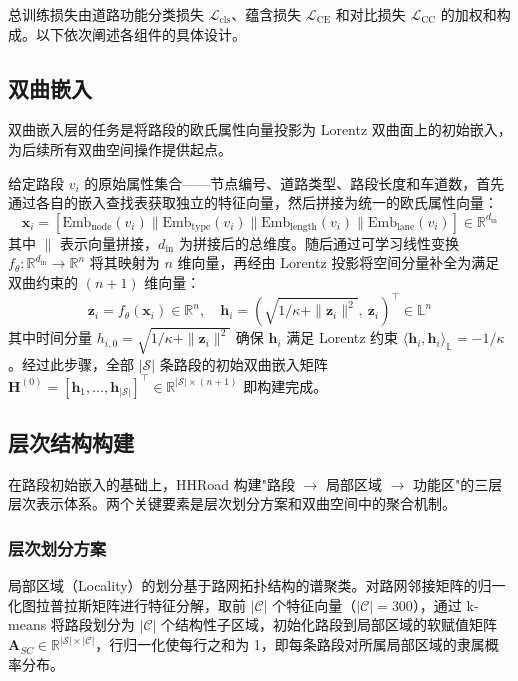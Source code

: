 总训练损失由道路功能分类损失 $\mathcal{L}_{\text{cls}}$、蕴含损失 $\mathcal{L}_{\text{CE}}$ 和对比损失 $\mathcal{L}_{\text{CC}}$ 的加权和构成。以下依次阐述各组件的具体设计。

\subsection{双曲嵌入}

双曲嵌入层的任务是将路段的欧氏属性向量投影为 Lorentz 双曲面上的初始嵌入，为后续所有双曲空间操作提供起点。

给定路段 $v_i$ 的原始属性集合——节点编号、道路类型、路段长度和车道数，首先通过各自的嵌入查找表获取独立的特征向量，然后拼接为统一的欧氏属性向量：
\begin{equation}
    \mathbf{x}_i = [\mathrm{Emb}_{\text{node}}(v_i) \| \mathrm{Emb}_{\text{type}}(v_i) \| \mathrm{Emb}_{\text{length}}(v_i) \| \mathrm{Emb}_{\text{lane}}(v_i)] \in \mathbb{R}^{d_{\text{in}}}
\end{equation}
其中 $\|$ 表示向量拼接，$d_{\text{in}}$ 为拼接后的总维度。随后通过可学习线性变换 $f_\theta: \mathbb{R}^{d_{\text{in}}} \to \mathbb{R}^n$ 将其映射为 $n$ 维向量，再经由 Lorentz 投影将空间分量补全为满足双曲约束的 $(n+1)$ 维向量：
\begin{equation}
    \mathbf{z}_i = f_\theta(\mathbf{x}_i) \in \mathbb{R}^n, \quad \mathbf{h}_i = \left(\sqrt{1/\kappa + \|\mathbf{z}_i\|^2},\ \mathbf{z}_i\right)^\top \in \mathbb{L}^n
\end{equation}
其中时间分量 $h_{i,0} = \sqrt{1/\kappa + \|\mathbf{z}_i\|^2}$ 确保 $\mathbf{h}_i$ 满足 Lorentz 约束 $\langle \mathbf{h}_i, \mathbf{h}_i \rangle_{\mathbb{L}} = -1/\kappa$。经过此步骤，全部 $|\mathcal{S}|$ 条路段的初始双曲嵌入矩阵 $\mathbf{H}^{(0)} = [\mathbf{h}_1, \ldots, \mathbf{h}_{|\mathcal{S}|}]^\top \in \mathbb{R}^{|\mathcal{S}| \times (n+1)}$ 即构建完成。

\subsection{层次结构构建}

在路段初始嵌入的基础上，HHRoad 构建"路段 $\to$ 局部区域 $\to$ 功能区"的三层层次表示体系。两个关键要素是层次划分方案和双曲空间中的聚合机制。

\subsubsection{层次划分方案}

局部区域（Locality）的划分基于路网拓扑结构的谱聚类\cite{von2007tutorial}。对路网邻接矩阵的归一化图拉普拉斯矩阵进行特征分解，取前 $|\mathcal{C}|$ 个特征向量（$|\mathcal{C}|=300$），通过 k-means 将路段划分为 $|\mathcal{C}|$ 个结构性子区域，初始化路段到局部区域的软赋值矩阵 $\mathbf{A}_{SC} \in \mathbb{R}^{|\mathcal{S}| \times |\mathcal{C}|}$，行归一化使每行之和为 1，即每条路段对所属局部区域的隶属概率分布。

